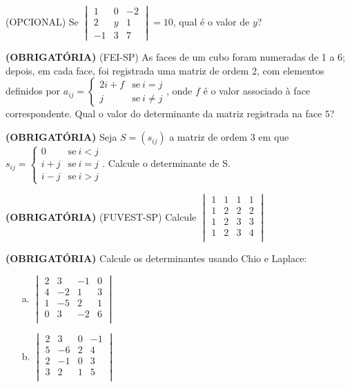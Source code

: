 \documentclass[pdftex, brazil, 12pt, oneside, addpoints]{exam}
\begin{document}
\begin{questions}
\question
(OPCIONAL) Se
$\begin{vmatrix}
  1 & 0 & -2\\
  2 & y &  1\\
 -1 & 3 & 7
\end{vmatrix} = 10$, qual é o valor de $y$?

\question
\textbf{(OBRIGATÓRIA)} (FEI-SP) As faces de um cubo foram numeradas de 1 a 6; depois, em cada face, foi
registrada uma matriz de ordem 2, com elementos definidos por
$a_{ij} =
    \begin{cases}
      2i + f & \text{se}\ i = j\\
      j      & \text{se}\ i \ne j
    \end{cases}
$, onde $f$ é o valor associado à face correspondente. Qual o valor do determinante
da matriz registrada na face $5$?

\question
\textbf{(OBRIGATÓRIA)} Seja $S = (s_{ij})$ a matriz de ordem $3$ em que
$s_{ij} =
\begin{cases}
  0     & \text{se}\ i < j\\
  i + j & \text{se}\ i = j\\
  i - j & \text{se}\ i > j
\end{cases}
$. Calcule o determinante de S.

\question
\textbf{(OBRIGATÓRIA)} (FUVEST-SP) Calcule
$\begin{vmatrix}
  1 & 1 & 1 & 1\\
  1 & 2 & 2 & 2\\
  1 & 2 & 3 & 3\\
  1 & 2 & 3 & 4\\
\end{vmatrix}$

\question
\textbf{(OBRIGATÓRIA)} Calcule os determinantes usando Chio e Laplace:
\begin{itemize}
\item[a.]
$\begin{vmatrix}
  2 &  3 & -1 & 0\\
  4 & -2 &  1 & 3\\
  1 & -5 &  2 & 1\\
  0 &  3 & -2 & 6\\
\end{vmatrix}$  
\item[b.]
$\begin{vmatrix}
  2 &  3 & 0 & -1\\
  5 & -6 & 2 &  4\\
  2 & -1 & 0 &  3\\
  3 &  2 & 1 &  5\\
\end{vmatrix}$
\end{itemize}



\end{questions}
\end{document}
